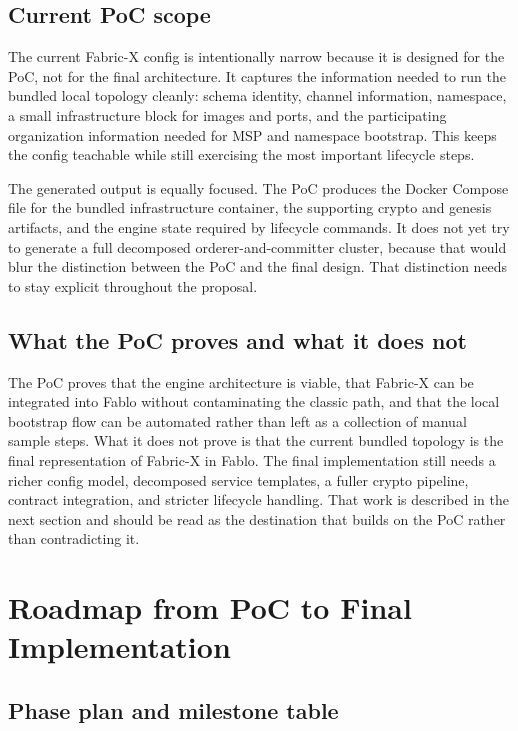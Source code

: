 \subsection{Current PoC scope}

The current Fabric-X config is intentionally narrow because it is designed for the PoC, not for the final architecture. It captures the information needed to run the bundled local topology cleanly: schema identity, channel information, namespace, a small infrastructure block for images and ports, and the participating organization information needed for MSP and namespace bootstrap. This keeps the config teachable while still exercising the most important lifecycle steps.

The generated output is equally focused. The PoC produces the Docker Compose file for the bundled infrastructure container, the supporting crypto and genesis artifacts, and the engine state required by lifecycle commands. It does not yet try to generate a full decomposed orderer-and-committer cluster, because that would blur the distinction between the PoC and the final design. That distinction needs to stay explicit throughout the proposal.

\subsection{What the PoC proves and what it does not}

The PoC proves that the engine architecture is viable, that Fabric-X can be integrated into Fablo without contaminating the classic path, and that the local bootstrap flow can be automated rather than left as a collection of manual sample steps. What it does not prove is that the current bundled topology is the final representation of Fabric-X in Fablo. The final implementation still needs a richer config model, decomposed service templates, a fuller crypto pipeline, contract integration, and stricter lifecycle handling. That work is described in the next section and should be read as the destination that builds on the PoC rather than contradicting it.

\section{Roadmap from PoC to Final Implementation}

\subsection{Phase plan and milestone table}

